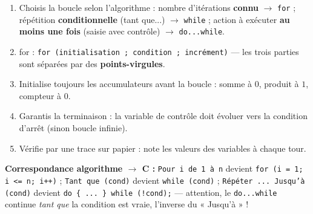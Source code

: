 \documentclass[11pt]{article}
\newcommand{\cle}[1]{{\popxbold\color{popdark}#1}}
\begin{document}
\begin{methode}
\begin{enumerate}
\item \cle{Choisis} la boucle selon l'algorithme : nombre d'itérations \textbf{connu} $\to$ \texttt{for} ; répétition \textbf{conditionnelle} (tant que...) $\to$ \texttt{while} ; action à exécuter \textbf{au moins une fois} (saisie avec contrôle) $\to$ \texttt{do...while}.
\item \cle{for} : \texttt{for (initialisation ; condition ; incrément)} — les trois parties sont séparées par des \textbf{points-virgules}.
\item \cle{Initialise} toujours les accumulateurs avant la boucle : somme à $0$, produit à $1$, compteur à $0$.
\item \cle{Garantis} la terminaison : la variable de contrôle doit évoluer vers la condition d'arrêt (sinon boucle infinie).
\item \cle{Vérifie} par une trace sur papier : note les valeurs des variables à chaque tour.
\end{enumerate}
\textbf{Correspondance algorithme $\to$ C :} \texttt{Pour i de 1 à n} devient \texttt{for (i = 1; i <= n; i++)} ; \texttt{Tant que (cond)} devient \texttt{while (cond)} ; \texttt{Répéter ... Jusqu'à (cond)} devient \texttt{do \{ ... \} while (!cond);} — attention, le \texttt{do...while} continue \emph{tant que} la condition est vraie, l'inverse du « Jusqu'à » !
\end{methode}
\end{document}
